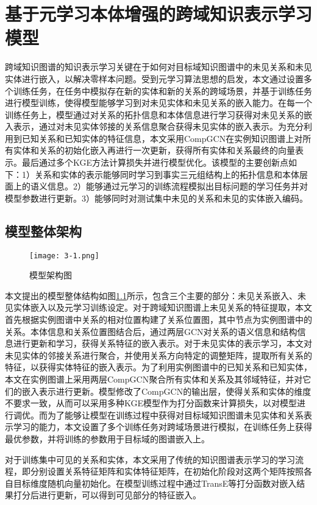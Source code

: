 \chapter{基于元学习本体增强的跨域知识表示学习模型}
跨域知识图谱的知识表示学习关键在于如何对目标域知识图谱中的未见关系和未见实体进行嵌入，以解决零样本问题。受到元学习算法思想的启发，本文通过设置多个训练任务，在任务中模拟存在新的实体和新的关系的跨域场景，并基于训练任务进行模型训练，使得模型能够学习到对未见实体和未见关系的嵌入能力。在每一个训练任务上，模型通过对关系的拓扑信息和本体信息进行学习获得对未见关系的嵌入表示，通过对未见实体邻接的关系信息聚合获得未见实体的嵌入表示。为充分利用到已知关系和已知实体的特征信息，本文采用CompGCN在实例知识图谱上对所有实体和关系的初始化嵌入再进行一次更新，获得所有实体和关系最终的向量表示。最后通过多个KGE方法计算损失并进行模型优化。该模型的主要创新点如下：1）关系和实体的表示能够同时学习到事实三元组结构上的拓扑信息和本体层面上的语义信息。2）能够通过元学习的训练流程模拟出目标问题的学习任务并对模型参数进行更新。3）能够同时对测试集中未见的关系和未见的实体嵌入编码。

\section{模型整体架构}
\begin{figure}[h]
  \centering
  \texttt{[image: 3-1.png]}
  \caption{模型架构图}
  \label{fig:3-1}
\end{figure}

本文提出的模型整体结构如图\ref{fig:3-1}所示，包含三个主要的部分：未见关系嵌入、未见实体嵌入以及元学习训练设定。对于跨域知识图谱上未见关系的特征提取，本文首先根据实例图谱中关系的相对位置构建了关系位置图，其中节点为实例图谱中的关系。本体信息和关系位置图结合后，通过两层GCN对关系的语义信息和结构信息进行更新和学习，获得关系特征的嵌入表示。对于未见实体的表示学习，本文对未见实体的邻接关系进行聚合，并使用关系方向特定的调整矩阵，提取所有关系的特征，以获得实体特征的嵌入表示。为了利用实例图谱中的已知关系和已知实体，本文在实例图谱上采用两层CompGCN聚合所有实体和关系及其邻域特征，并对它们的嵌入表示进行更新。模型修改了CompGCN的输出层，使得关系和实体的维度不要求一致，从而可以采用多种KGE模型作为打分函数来计算损失，以对模型进行调优。而为了能够让模型在训练过程中获得对目标域知识图谱未见实体和关系表示学习的能力，本文设置了多个训练任务对跨域场景进行模拟，在训练任务上获得最优参数，并将训练的参数用于目标域的图谱嵌入上。

对于训练集中可见的关系和实体，本文采用了传统的知识图谱表示学习的学习流程，即分别设置关系特征矩阵和实体特征矩阵，在初始化阶段对这两个矩阵按照各自目标维度随机向量初始化。在模型训练过程中通过TransE等打分函数对嵌入结果打分后进行更新，可以得到可见部分的特征嵌入。


